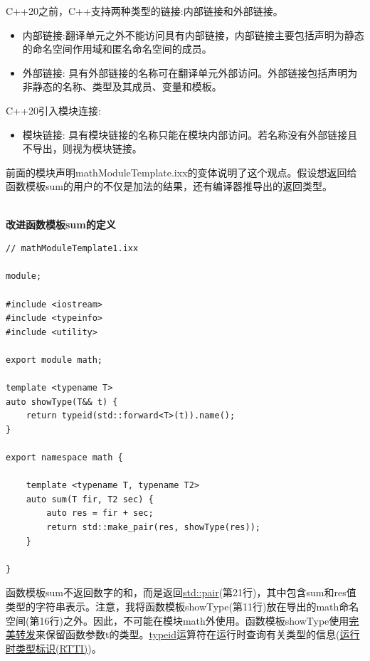 C++20之前，C++支持两种类型的链接:内部链接和外部链接。

\begin{itemize}
\item 
内部链接:翻译单元之外不能访问具有内部链接，内部链接主要包括声明为静态的命名空间作用域和匿名命名空间的成员。

\item 
外部链接: 具有外部链接的名称可在翻译单元外部访问。外部链接包括声明为非静态的名称、类型及其成员、变量和模板。
\end{itemize}

C++20引入模块连接:

\begin{itemize}
\item 
模块链接: 具有模块链接的名称只能在模块内部访问。若名称没有外部链接且不导出，则视为模块链接。
\end{itemize}

前面的模块声明mathModuleTemplate.ixx的变体说明了这个观点。假设想返回给函数模板sum的用户的不仅是加法的结果，还有编译器推导出的返回类型。

\hspace*{\fill} \\ %
\noindent
\textbf{改进函数模板sum的定义}
\begin{lstlisting}[style=styleCXX]
// mathModuleTemplate1.ixx

module;

#include <iostream>
#include <typeinfo>
#include <utility>

export module math;

template <typename T>
auto showType(T&& t) {
	return typeid(std::forward<T>(t)).name();
}

export namespace math {

	template <typename T, typename T2>
	auto sum(T fir, T2 sec) {
		auto res = fir + sec;
		return std::make_pair(res, showType(res));
	}

}
\end{lstlisting}

函数模板sum不返回数字的和，而是返回\href{https://en.cppreference.com/w/cpp/utility/pair}{std::pair}(第21行)，其中包含sum和res值类型的字符串表示。注意，我将函数模板showType(第11行)放在导出的math命名空间(第16行)之外。因此，不可能在模块math外使用。函数模板showType使用\href{https://www.modernescpp.com/index.php/perfect-forwarding}{完美转发}来保留函数参数t的类型。\href{https://en.cppreference.com/w/cpp/language/typeid}{typeid}运算符在运行时查询有关类型的信息(\href{https://en.cppreference.com/w/cpp/types}{运行时类型标识(RTTI)})。

